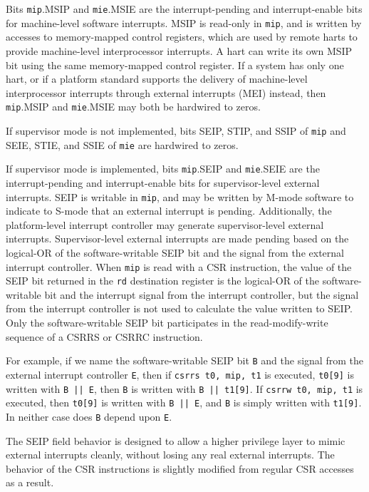 Bits {\tt mip}.MSIP and {\tt mie}.MSIE are the interrupt-pending and
interrupt-enable bits for machine-level software interrupts.
MSIP is read-only in {\tt mip}, and is written by accesses
to memory-mapped control registers, which are used by remote harts to
provide machine-level interprocessor interrupts.
A hart can write its
own MSIP bit using the same memory-mapped control register.
If a system has only one hart, or if a platform standard supports the
delivery of machine-level interprocessor interrupts through external
interrupts (MEI) instead, then {\tt mip}.MSIP and {\tt mie}.MSIE may
both be hardwired to zeros.

If supervisor mode is not implemented, bits SEIP, STIP, and SSIP of
{\tt mip} and SEIE, STIE, and SSIE of {\tt mie} are hardwired to zeros.

If supervisor mode is implemented, bits {\tt mip}.SEIP and {\tt mie}.SEIE
are the interrupt-pending and interrupt-enable bits for supervisor-level
external interrupts.
SEIP is writable in {\tt mip}, and
may be written by M-mode software to indicate to S-mode that an
external interrupt is pending.  Additionally, the platform-level
interrupt controller may generate supervisor-level external interrupts.
Supervisor-level external interrupts are made pending based on the
logical-OR of the software-writable SEIP bit and the signal from the
external interrupt controller.
When {\tt mip} is read with a CSR instruction,
the value of the SEIP bit returned in the {\tt rd} destination
register is the logical-OR of the software-writable bit and the
interrupt signal from the interrupt controller, but the signal from the
interrupt controller is not used to calculate the value written to SEIP.
Only the software-writable SEIP bit participates in the
read-modify-write sequence of a CSRRS or CSRRC instruction.

\begin{commentary}
  For example, if we name the software-writable SEIP bit {\tt B} and the
  signal from the external interrupt controller {\tt E}, then if \mbox{\tt csrrs
  t0, mip, t1} is executed, {\tt t0[9]} is written with \mbox{\tt B || E}, then
  {\tt B} is written with \mbox{\tt B || t1[9]}.
  If \mbox{\tt csrrw t0, mip, t1} is executed, then {\tt t0[9]} is written with
  \mbox{\tt B || E}, and {\tt B} is simply written with {\tt t1[9]}.
  In neither case does {\tt B} depend upon {\tt E}.

  The SEIP field behavior is designed to allow a higher privilege
  layer to mimic external interrupts cleanly, without losing any real
  external interrupts.  The behavior of the CSR instructions is
  slightly modified from regular CSR accesses as a result.
\end{commentary}

